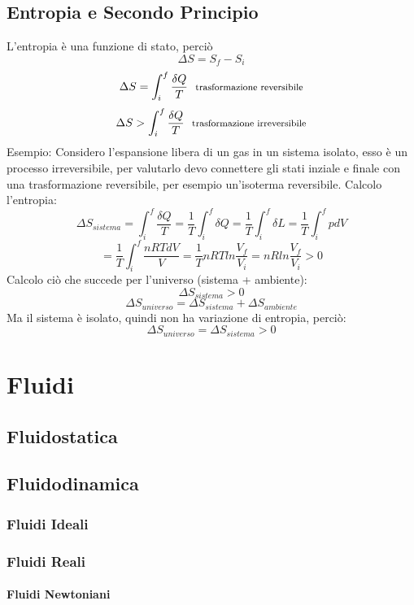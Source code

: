 \documentclass[12pt]{article}
\begin{document}
    \subsection{Entropia e Secondo Principio}
        L'entropia è una funzione di stato, perciò
        \[\Delta S = S_f - S_i\]
        \[\Delta S = \int_{i}^{f} \frac{\delta Q}{T}  \:\:\:\text{\footnotesize{trasformazione 
        reversibile}}\]
        \[\Delta S > \int_{i}^{f} \frac{\delta Q}{T}  \:\:\:\text{\footnotesize{trasformazione 
        irreversibile}}\]
        Esempio:
        Considero l'espansione libera di un gas in un sistema isolato, esso è un processo irreversibile, 
        per valutarlo devo connettere gli stati inziale e finale con una trasformazione reversibile, per esempio un'isoterma reversibile.
        \newline
        Calcolo l'entropia:
        \[\Delta S_{sistema} = \int_{i}^{f} \frac{\delta Q}{T} = \frac{1}{T} \int_{i}^{f}{\delta Q} = \frac{1}{T} \int_{i}^{f}{\delta L} = \frac{1}{T} \int_{i}^{f}{pdV} \]
        \[= \frac{1}{T} \int_{i}^{f}{\frac{nRTdV}{V}} = \frac{1}{T} nRT ln{\frac{V_f}{V_i}} = nRln{\frac{V_f}{V_i}} > 0\]
        Calcolo ciò che succede per l'universo (sistema + ambiente):
        \[\Delta S_{sistema} > 0\]
        \[\Delta S_{universo} = \Delta S_{sistema} + \Delta S_{ambiente} \]
        Ma il sistema è isolato, quindi non ha variazione di entropia, perciò:
        \[\Delta S_{universo} = \Delta S_{sistema} > 0\]
        \section{Fluidi}
    \subsection{Fluidostatica}
    \subsection{Fluidodinamica}
        \subsubsection{Fluidi Ideali}
        \subsubsection{Fluidi Reali}
            \paragraph{Fluidi Newtoniani}
\end{document}
